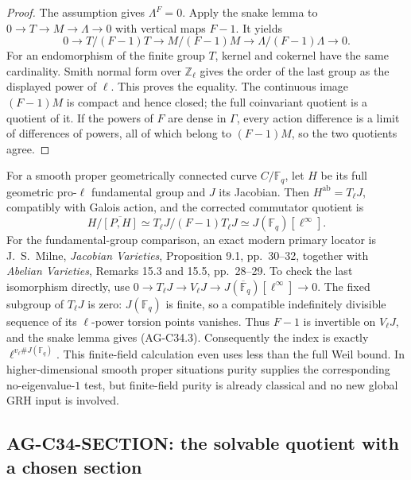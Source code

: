 \documentclass[11pt,a4paper]{article}
\begin{document}
\begin{proof}
The assumption gives $\Lambda^F=0$. Apply the snake lemma to
$0\to T\to M\to\Lambda\to0$ with vertical maps $F-1$.
It yields
\[
 0\longrightarrow T/(F-1)T\longrightarrow M/(F-1)M
 \longrightarrow\Lambda/(F-1)\Lambda\longrightarrow0.
\]
For an endomorphism of the finite group $T$, kernel and cokernel have
the same cardinality. Smith normal form over $\mathbb Z_\ell$ gives
the order of the last group as the displayed power of $\ell$.
This proves the equality. The continuous image $(F-1)M$ is compact
and hence closed; the full coinvariant quotient is a quotient of it.
If the powers of $F$ are dense in $\Gamma$, every action difference
is a limit of differences of powers, all of which belong to
$(F-1)M$, so the two quotients agree.
\end{proof}

For a smooth proper geometrically connected curve $C/\mathbb F_q$,
let $H$ be its full geometric pro-$\ell$ fundamental group and $J$ its
Jacobian. Then $H^{\mathrm{ab}}=T_\ell J$, compatibly with Galois
action, and the corrected commutator quotient is
\[
 H/\overline{[P,H]}
       \simeq T_\ell J/(F-1)T_\ell J
       \simeq J(\mathbb F_q)[\ell^\infty].             \tag{AG-C34.3}
\]
For the fundamental-group comparison, an exact modern primary locator
is J.~S.~Milne, \emph{Jacobian Varieties}, Proposition 9.1,
pp.~30--32, together with \emph{Abelian Varieties}, Remarks 15.3
and 15.5, pp.~28--29. To check the last isomorphism directly, use
$0\to T_\ell J\to V_\ell J\to J(\overline{\mathbb F}_q)
[\ell^\infty]\to0$. The fixed subgroup of $T_\ell J$ is zero:
$J(\mathbb F_q)$ is finite, so a compatible indefinitely divisible
sequence of its $\ell$-power torsion points vanishes. Thus $F-1$ is
invertible on $V_\ell J$, and the snake lemma gives (AG-C34.3).
Consequently the index is exactly $\ell^{v_\ell\#J(\mathbb F_q)}$.
This finite-field calculation even uses less than the full Weil bound.
In higher-dimensional smooth proper situations purity supplies the
corresponding no-eigenvalue-$1$ test, but finite-field purity is already
classical and no new global GRH input is involved.

\subsection{AG-C34-SECTION: the solvable quotient with a chosen section}
\label{ag:c34section}
\end{document}

